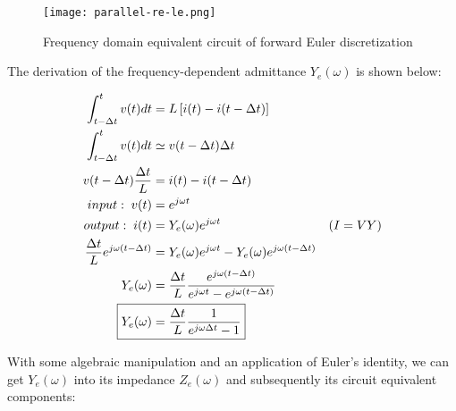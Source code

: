 \documentclass[10pt, oneside, letterpaper]{article}
\begin{document}
\begin{figure}[H]
  \centering
  \texttt{[image: parallel-re-le.png]}
  \caption{Frequency domain equivalent circuit of forward Euler discretization}
  \label{forward-euler-circuit}
\end{figure}

The derivation of the frequency-dependent admittance $Y_e{}(\omega{})$ is shown below:

\begin{alignat}{2}
\int_{t-\Delta{}t}^{t}v(t)dt &= L\left[i(t) - i(t-\Delta{}t)\right] \\
\int_{t-\Delta{}t}^{t}v(t)dt &\simeq v(t-\Delta{}t)\Delta{}t \\
v(t-\Delta{}t)\frac{\Delta{}t}{L} &= i(t) - i(t-\Delta{}t) \\
input:\;v(t) &= e^{j\omega{}t} \\
output:\;i(t) &= Y_e{}(\omega)e^{j\omega{}t} & (I = VY)\\
\frac{\Delta{}t}{L}e^{j\omega{}(t-\Delta{}t)} &= Y_e{}(\omega)e^{j\omega{}t} - Y_e{}(\omega)e^{j\omega{}(t-\Delta{}t)} \\
Y_e{}(\omega)&=\frac{\Delta{}t}{L}\frac{e^{j\omega{}(t-\Delta{}t)}}{e^{j\omega{}t}-e^{j\omega{}(t-\Delta{}t)}} \\
\Aboxed{Y_e{}(\omega)&=\frac{\Delta{}t}{L}\frac{1}{e^{j\omega{}\Delta{}t}-1}}
\end{alignat}

With some algebraic manipulation and an application of Euler's identity, we can get $Y_e{}(\omega)$ into its impedance $Z_e{}(\omega)$ and subsequently its circuit equivalent components:
\end{document}
